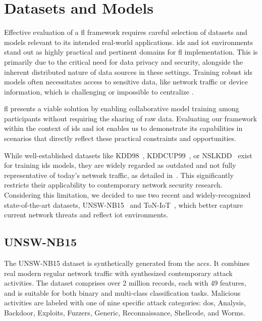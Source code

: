 \section{Datasets and Models}
\label{sec:datasets-and-models}

Effective evaluation of a \ac{fl} framework requires careful selection of datasets and models relevant to its intended real-world applications. \ac{ids} and \ac{iot} environments stand out as highly practical and pertinent domains for \ac{fl} implementation. This is primarily due to the critical need for data privacy and security, alongside the inherent distributed nature of data sources in these settings. Training robust \ac{ids} models often necessitates access to sensitive data, like network traffic or device information, which is challenging or impossible to centralize \cite{10608461}.

\ac{fl} presents a viable solution by enabling collaborative model training among participants without requiring the sharing of raw data. Evaluating our framework within the context of \ac{ids} and \ac{iot} enables us to demonstrate its capabilities in scenarios that directly reflect these practical constraints and opportunities.

While well-established datasets like KDD98~\cite{kdd98}, KDDCUP99~\cite{kdd99}, or NSLKDD~\cite{nslkdd} exist for training \ac{ids} models, they are widely regarded as outdated and not fully representative of today's network traffic, as detailed in~\cite{kostas2023iotgem}. This significantly restricts their applicability to contemporary network security research. Considering this limitation, we decided to use two recent and widely-recognized state-of-the-art datasets, UNSW-NB15~\cite{unswnb15} and ToN-IoT~\cite{toniot}, which better capture current network threats and reflect \ac{iot} environments.

\subsection{UNSW-NB15}
\label{sec:unsw-nb15}

The UNSW-NB15 dataset is synthetically generated from the \ac{accs}. It combines real modern regular network traffic with synthesized contemporary attack activities. The dataset comprises over 2 million records, each with 49 features, and is suitable for both binary and multi-class classification tasks. Malicious activities are labeled with one of nine specific attack categories: \ac{dos}, Analysis, Backdoor, Exploits, Fuzzers, Generic, Reconnaissance, Shellcode, and Worms.

